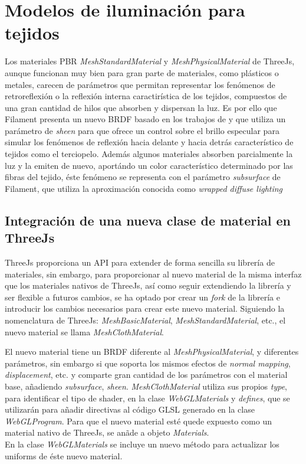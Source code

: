 \chapter{Modelos de iluminaci\'on para tejidos}

Los materiales PBR \textit{MeshStandardMaterial} y \textit{MeshPhysicalMaterial} de ThreeJs, aunque funcionan muy bien para gran parte de
materiales, como pl\'asticos o metales, carecen de par\'ametros que permitan representar los fen\'omenos de retroreflexi\'on o
la reflexi\'on interna caractir\'istica de los tejidos, compuestos de una gran cantidad de hilos que absorben y dispersan la luz.
Es por ello que Filament presenta un nuevo BRDF basado en los trabajos de y que utiliza un par\'ametro de \textit{sheen} para
que ofrece un control sobre el brillo especular para simular los fen\'omenos de reflexi\'on hacia delante y hacia detr\'as
caracter\'istico de tejidos como el terciopelo. Adem\'as algunos materiales absorben parcialmente la luz y la emiten de nuevo,
aport\'ando un color caracter\'istico determinado por las fibras del tejido, \'este fen\'omeno se representa con el par\'ametro
\textit{subsurface} de Filament, que utiliza la aproximaci\'on conocida como \textit{wrapped diffuse lighting} \autocite{orennayar}


\section{Integraci\'on de una nueva clase de material en ThreeJs}
ThreeJs proporciona un API para extender de forma sencilla su librer\'ia de materiales, sin embargo, para proporcionar al nuevo
material de la misma interfaz que los materiales nativos de ThreeJs, as\'i como seguir extendiendo la librer\'ia y ser flexible
a futuros cambios, se ha optado por crear un \textit{fork} de la librer\'ia e introducir los cambios necesarios para crear
este nuevo material. Siguiendo la nomenclatura de ThreeJs: \textit{MeshBasicMaterial}, \textit{MeshStandardMaterial}, etc., el
nuevo material se llama \textit{MeshClothMaterial}.

El nuevo material tiene un BRDF diferente al \textit{MeshPhysicalMaterial},
y diferentes par\'ametros, sin embargo si que soporta los mismos efectos de \textit{normal mapping}, \textit{displacement}, etc.
y comparte gran cantidad de los par\'ametros con el material base, a\~nadiendo \textit{subsurface}, \textit{sheen}.
\textit{MeshClothMaterial} utiliza sus propios \textit{type}, para identificar el tipo
de shader, en la clase \textit{WebGLMaterials} y \textit{defines}, que se utilizar\'an para a\~nadir directivas al c\'odigo GLSL
generado en la clase \textit{WebGLProgram}. Para que el nuevo material est\'e quede expuesto como un material nativo de ThreeJs,
se an\~ade a objeto \textit{Materials}.\\
En la clase \textit{WebGLMaterials} se incluye un nuevo m\'etodo para actualizar los uniforms de \'este nuevo material.

